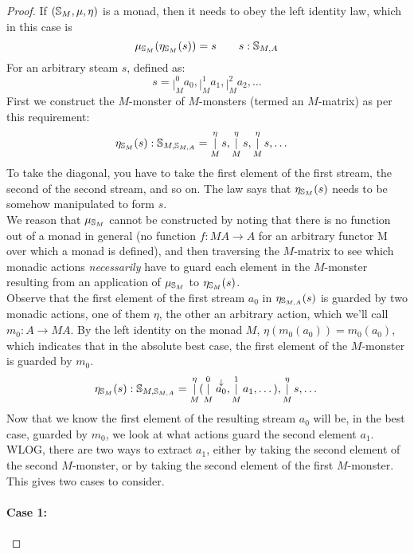 \documentclass{article}
\begin{document}
\begin{proof}
If $(\mathbb{S}_{M}, \mu, \eta)$ is a monad, then it needs to obey the left identity law, which in this case is
$$
\mu_{\mathbb{S}_{M}}(\eta_{\mathbb{S}_{M}}(s)) = s
\qquad s : \mathbb{S}_{M,A}
$$
For an arbitrary steam $s$, defined as:
$$
s = \mathop{|}_M^0 a_0, \mathop{|}_M^1 a_1, \mathop{|}_M^2  a_2, \dots
$$
First we construct the $M$-monster of $M$-monsters (termed an $M$-matrix) as per this requirement:
\begin{align*}
&\eta_{\mathbb{S}_{M}}(s) : \mathbb{S}_{M,\mathbb{S}_{M,A}} = \mathop{|}_M^\eta s, \mathop{|}_M^\eta s, \mathop{|}_M^\eta s, \dots
\end{align*}
To take the diagonal, you have to take the first element of the first stream, the second of the second stream, and so on. The law says that $\eta_{\mathbb{S}_{M}}(s)$ needs to be somehow manipulated to form $s$. \\

We reason that $\mu_{\mathbb{S}_{M}}$ cannot be constructed by noting that there is no function out of a monad in general (no function $f : MA \to A$ for an arbitrary functor M over which a monad is defined), and then traversing the $M$-matrix to see which monadic actions \emph{necessarily} have to guard each element in the $M$-monster resulting from an application of $\mu_{\mathbb{S}_{M}}$ to $\eta_{\mathbb{S}_{M}}(s)$.\\

Observe that the first element of the first stream $a_0$ in $\eta_{\mathbb{S}_{M,A}}(s)$ is guarded by two monadic actions, one of them $\eta$, the other an arbitrary action, which we'll call $m_0 : A \to MA$. By the left identity on the monad $M$, $\eta(m_0(a_0)) = m_0(a_0)$, which indicates that in the absolute best case, the first element of the $M$-monster is guarded by $m_0$.
$$
\eta_{\mathbb{S}_{M}}(s) : \mathbb{S}_{M,\mathbb{S}_{M,A}} = \mathop{|}_M^\eta (\mathop{|}_M^0 \stackrel{\downarrow}{a_0}, \mathop{|}_M^1 a_1, \dots), \mathop{|}_M^\eta s, \dots
$$
Now that we know the first element of the resulting stream $a_0$ will be, in the best case, guarded by $m_0$, we look at what actions guard the second element $a_1$. WLOG, there are two ways to extract $a_1$, either by taking the second element of the second $M$-monster, or by taking the second element of the first $M$-monster. This gives two cases to consider.\\

\paragraph{Case 1:}


\end{proof}
\end{document}

